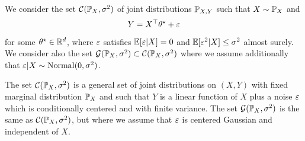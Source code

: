 \begin{definition}
	We consider the set $\cC(\P_X, \sigma^2)$ of joint distributions $\P_{X, Y}$ such that $X \sim \P_X$ and
	\begin{equation*}
		Y = X^\top \theta^\star + \eps
	\end{equation*}
	for some $ \theta^\star \in \R^d$, where $\eps$ satisfies $\E[\eps | X] = 0$ and $\E[\eps^2 | X] \leq \sigma^2$ almost surely. We consider also the set $\cG(\P_X, \sigma^2) \subset \cC(\P_X, \sigma^2)$ where we assume additionally that $\eps | X \sim \nor(0, \sigma^2)$.
\end{definition}
The set $\cC(\P_X, \sigma^2)$ is a general set of joint distributions on $(X, Y)$ with fixed marginal distribution $\P_X$ and such that $Y$ is a linear function of $X$ plus a noise $\eps$ which is conditionally centered and with finite variance. 
The set $\cG(\P_X, \sigma^2)$ is the same as $\cC(\P_X, \sigma^2)$, but where we assume that $\eps$ is centered Gaussian and independent of $X$.

